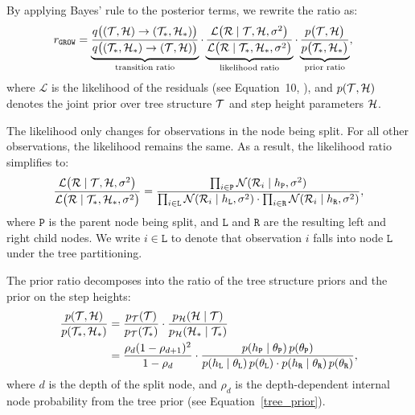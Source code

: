 By applying Bayes' rule to the posterior terms, we rewrite the ratio as:
\begin{equation}
\begin{split}
    r_\texttt{GROW} 
    &= \underbrace{\frac{q\big((\mathcal{T}, \mathcal{H}) \to (\mathcal{T}_*, \mathcal{H}_*)\big)}{q\big((\mathcal{T}_*, \mathcal{H}_*) \to (\mathcal{T}, \mathcal{H})\big)}}_{\text{transition ratio}} 
    \cdot 
    \underbrace{\frac{\mathcal{L}\big(\mathcal{R} \mid \mathcal{T}, \mathcal{H}, \sigma^2\big)}{\mathcal{L}\big(\mathcal{R} \mid \mathcal{T}_*, \mathcal{H}_*, \sigma^2\big)}}_{\text{likelihood ratio}} 
    \cdot 
    \underbrace{\frac{p\big(\mathcal{T}, \mathcal{H}\big)}{p\big(\mathcal{T}_*, \mathcal{H}_*\big)}}_{\text{prior ratio}},
\end{split}
\end{equation}
where $\mathcal{L}$ is the likelihood of the residuals (see Equation~10, \citealp{main_article}), and $p(\mathcal{T}, \mathcal{H})$ denotes the joint prior over tree structure $\mathcal{T}$ and step height parameters $\mathcal{H}$.


The likelihood only changes for observations in the node being split. For all other observations, the likelihood remains the same. As a result, the likelihood ratio simplifies to:
\begin{equation}
    \frac{\mathcal{L}\big(\mathcal{R} \mid \mathcal{T}, \mathcal{H}, \sigma^2\big)}{\mathcal{L}\big(\mathcal{R} \mid \mathcal{T}_*, \mathcal{H}_*, \sigma^2\big)} = \frac{\prod_{i \in \texttt{P}} \mathcal{N}(\mathcal{R}_i \mid h_\texttt{P}, \sigma^2)}{\prod_{i \in \texttt{L}} \mathcal{N}(\mathcal{R}_i \mid h_\texttt{L}, \sigma^2) \cdot \prod_{i \in \texttt{R}} \mathcal{N}(\mathcal{R}_i \mid h_\texttt{R}, \sigma^2)},
\end{equation}
where $\texttt{P}$ is the parent node being split, and $\texttt{L}$ and $\texttt{R}$ are the resulting left and right child nodes.
We write $i \in \texttt{L}$ to denote that observation $i$ falls into node $\texttt{L}$ under the tree partitioning.

The prior ratio decomposes into the ratio of the tree structure priors and the prior on the step heights:
\begin{equation}
\begin{split}
    \frac{p(\mathcal{T}, \mathcal{H})}{p(\mathcal{T}_*, \mathcal{H}_*)} &= \frac{p_\mathcal{T}(\mathcal{T})}{p_\mathcal{T}(\mathcal{T}_*)} \cdot \frac{p_\mathcal{H}(\mathcal{H} \mid \mathcal{T})}{p_\mathcal{H}(\mathcal{H}_* \mid \mathcal{T}_*)} \\
    &= \frac{\rho_d(1-\rho_{d+1})^2}{1 - \rho_d} \cdot \frac{p(h_\texttt{P} \mid \theta_\texttt{P}) \, p(\theta_\texttt{P})}{p(h_\texttt{L} \mid \theta_\texttt{L}) \, p(\theta_\texttt{L}) \cdot p(h_\texttt{R} \mid \theta_\texttt{R}) \, p(\theta_\texttt{R})},
\end{split}
\end{equation}
where $d$ is the depth of the split node, and $\rho_d$ is the depth-dependent internal node probability from the tree prior (see Equation~\eqref{tree_prior}).

